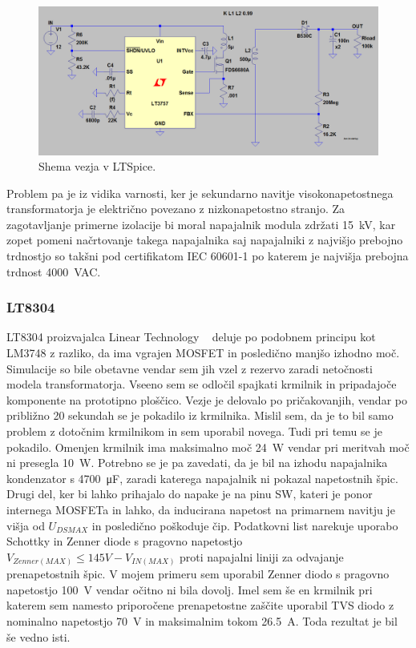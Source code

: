 \documentclass[a4paper,twoside,openright,12pt,Slovene]{book}
\begin{document}
    \begin{figure}[H]
        \centering
        \includegraphics[width=1\columnwidth]{Slike/Simulacije/LM3757spice.png}
        \caption{\label{LM3757spice} Shema vezja v LTSpice.}
    \end{figure}
    
Problem pa je iz vidika varnosti, ker je sekundarno navitje visokonapetostnega transformatorja je električno povezano z nizkonapetostno stranjo. Za zagotavljanje primerne izolacije bi moral napajalnik modula zdržati \SI{15}{\kilo\volt}, kar zopet pomeni načrtovanje takega napajalnika saj napajalniki z najvišjo prebojno trdnostjo so takšni pod certifikatom IEC 60601-1 po katerem je najvišja prebojna trdnost \SI{4000}{\volt}AC.

	\subsubsection{LT8304} \label{LT8304}
LT8304 proizvajalca Linear Technology ~\cite{analog:LT8304} deluje po podobnem principu kot LM3748 z razliko, da ima vgrajen MOSFET in posledično manjšo izhodno moč. Simulacije so bile obetavne vendar sem jih vzel z rezervo zaradi netočnosti modela transformatorja. Vseeno sem se odločil spajkati krmilnik in pripadajoče komponente na prototipno ploščico. Vezje je delovalo po pričakovanjih, vendar po približno 20 sekundah se je pokadilo iz krmilnika. Mislil sem, da je to bil samo problem z dotočnim krmilnikom in sem uporabil novega. Tudi pri temu se je pokadilo. Omenjen krmilnik ima maksimalno moč \SI{24}{\watt} vendar pri meritvah moč ni presegla \SI{10}{\watt}. Potrebno se je pa zavedati, da je bil na izhodu napajalnika kondenzator s \SI{4700}{\micro\farad}, zaradi katerega napajalnik ni pokazal napetostnih špic. Drugi del, ker bi lahko prihajalo do napake je na pinu SW, kateri je ponor internega MOSFETa in lahko, da inducirana napetost na primarnem navitju je višja od \(U_{DS MAX}\) in posledično poškoduje čip. Podatkovni list narekuje uporabo Schottky in Zenner diode s pragovno napetostjo \(V_{Zenner(MAX)} \leq 145V - V_{IN(MAX)}\) proti napajalni liniji za odvajanje prenapetostnih špic. V mojem primeru sem uporabil Zenner diodo s pragovno napetostjo \SI{100}{\volt} vendar očitno ni bila dovolj. Imel sem še en krmilnik pri katerem sem namesto priporočene prenapetostne zaščite uporabil TVS diodo z nominalno napetostjo \SI{70}{\volt} in maksimalnim tokom \SI{26.5}{\ampere}. Toda rezultat je bil še vedno isti.
\end{document}
